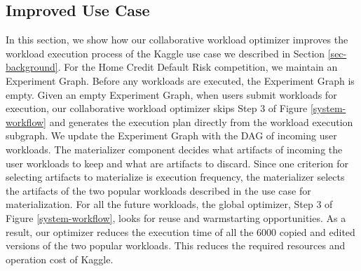 
\subsection{Improved Use Case}
In this section, we show how our collaborative workload optimizer improves the workload execution process of the Kaggle use case we described in Section \ref{sec-background}.
For the Home Credit Default Risk competition, we maintain an Experiment Graph.
Before any workloads are executed, the Experiment Graph is empty.
Given an empty Experiment Graph, when users submit workloads for execution, our collaborative workload optimizer skips Step 3 of Figure \ref{system-workflow} and generates the execution plan directly from the workload execution subgraph.
We update the Experiment Graph with the DAG of incoming user workloads.
The materializer component decides what artifacts of incoming the user workloads to keep and what are artifacts to discard.
Since one criterion for selecting artifacts to materialize is execution frequency, the materializer selects the artifacts of the two popular workloads described in the use case for materialization.
For all the future workloads, the global optimizer, Step 3 of Figure \ref{system-workflow}, looks for reuse and warmstarting opportunities. 
As a result, our optimizer reduces the execution time of all the 6000 copied and edited versions of the two popular workloads. 
This reduces the required resources and operation cost of Kaggle.